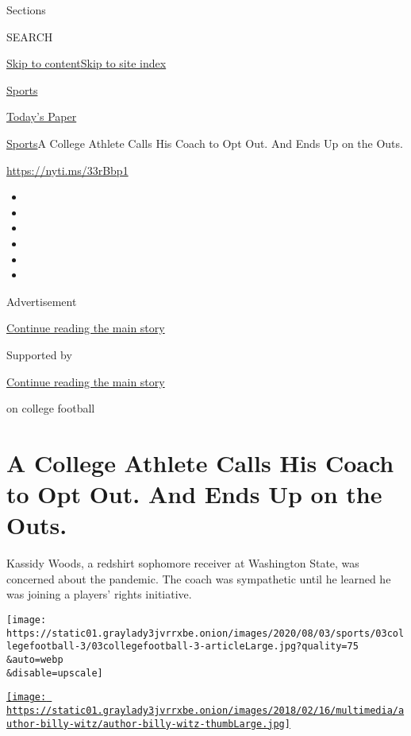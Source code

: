Sections

SEARCH

\protect\hyperlink{site-content}{Skip to
content}\protect\hyperlink{site-index}{Skip to site index}

\href{https://www.nytimes3xbfgragh.onion/section/sports}{Sports}

\href{https://myaccount.nytimes3xbfgragh.onion/auth/login?response_type=cookie\&client_id=vi}{}

\href{https://www.nytimes3xbfgragh.onion/section/todayspaper}{Today's
Paper}

\href{/section/sports}{Sports}\textbar{}A College Athlete Calls His
Coach to Opt Out. And Ends Up on the Outs.

\url{https://nyti.ms/33rBbp1}

\begin{itemize}
\item
\item
\item
\item
\item
\item
\end{itemize}

Advertisement

\protect\hyperlink{after-top}{Continue reading the main story}

Supported by

\protect\hyperlink{after-sponsor}{Continue reading the main story}

on college football

\hypertarget{a-college-athlete-calls-his-coach-to-opt-out-and-ends-up-on-the-outs}{%
\section{A College Athlete Calls His Coach to Opt Out. And Ends Up on
the
Outs.}\label{a-college-athlete-calls-his-coach-to-opt-out-and-ends-up-on-the-outs}}

Kassidy Woods, a redshirt sophomore receiver at Washington State, was
concerned about the pandemic. The coach was sympathetic until he learned
he was joining a players' rights initiative.

\texttt{[image: https://static01.graylady3jvrrxbe.onion/images/2020/08/03/sports/03collegefootball-3/03collegefootball-3-articleLarge.jpg?quality=75\\\&auto=webp\\\&disable=upscale]}

\href{https://www.nytimes3xbfgragh.onion/by/billy-witz}{\texttt{[image: https://static01.graylady3jvrrxbe.onion/images/2018/02/16/multimedia/author-billy-witz/author-billy-witz-thumbLarge.jpg]}}

